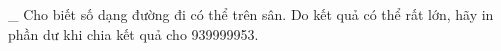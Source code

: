 \_ Cho biết số dạng đường đi có thể trên sân. Do kết quả có thể rất lớn, hãy in phần dư khi chia kết quả cho 939999953.